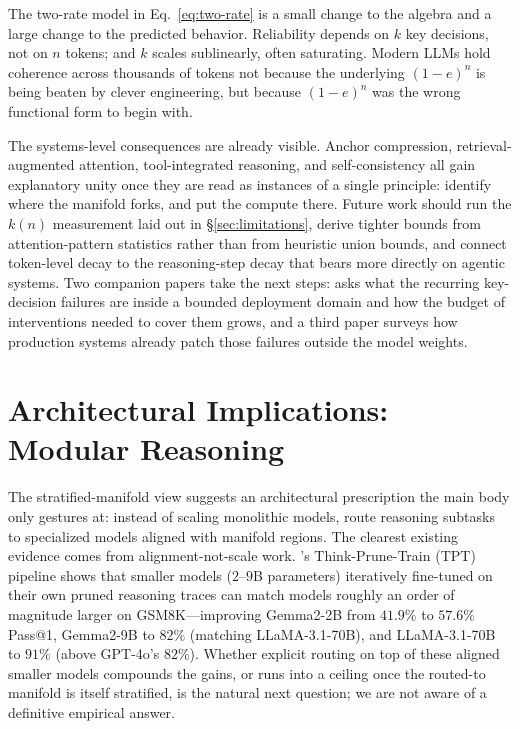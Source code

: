 The two-rate model in Eq.~\ref{eq:two-rate} is a small change to the algebra and a large change to the predicted behavior. Reliability depends on $k$ key decisions, not on $n$ tokens; and $k$ scales sublinearly, often saturating. Modern LLMs hold coherence across thousands of tokens not because the underlying $(1-e)^n$ is being beaten by clever engineering, but because $(1-e)^n$ was the wrong functional form to begin with.

The systems-level consequences are already visible. Anchor compression, retrieval-augmented attention, tool-integrated reasoning, and self-consistency all gain explanatory unity once they are read as instances of a single principle: identify where the manifold forks, and put the compute there. Future work should run the $k(n)$ measurement laid out in \S\ref{sec:limitations}, derive tighter bounds from attention-pattern statistics rather than from heuristic union bounds, and connect token-level decay to the reasoning-step decay that bears more directly on agentic systems. Two companion papers take the next steps: \citet{arbuzov2026architecture} asks what the recurring key-decision failures are inside a bounded deployment domain and how the budget of interventions needed to cover them grows, and a third paper surveys how production systems already patch those failures outside the model weights.




\appendix

\section{Architectural Implications: Modular Reasoning}
\label{app:arch}

The stratified-manifold view suggests an architectural prescription the main body only gestures at: instead of scaling monolithic models, route reasoning subtasks to specialized models aligned with manifold regions. The clearest existing evidence comes from alignment-not-scale work. \citet{costello2025think}'s Think-Prune-Train (TPT) pipeline shows that smaller models ($2$--$9$B parameters) iteratively fine-tuned on their own pruned reasoning traces can match models roughly an order of magnitude larger on GSM8K---improving Gemma2-2B from $41.9\%$ to $57.6\%$ Pass@1, Gemma2-9B to $82\%$ (matching LLaMA-3.1-70B), and LLaMA-3.1-70B to $91\%$ (above GPT-4o's $82\%$). Whether explicit routing on top of these aligned smaller models compounds the gains, or runs into a ceiling once the routed-to manifold is itself stratified, is the natural next question; we are not aware of a definitive empirical answer.

